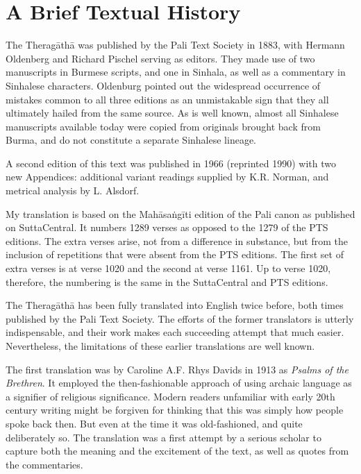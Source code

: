 \documentclass[12pt,openany]{book}%
\begin{document}
\section*{A Brief Textual History}

The \textsanskrit{Theragāthā} was published by the Pali Text Society in 1883, with Hermann Oldenberg and Richard Pischel serving as editors. They made use of two manuscripts in Burmese scripts, and one in Sinhala, as well as a commentary in Sinhalese characters. Oldenburg pointed out the widespread occurrence of mistakes common to all three editions as an unmistakable sign that they all ultimately hailed from the same source. As is well known, almost all Sinhalese manuscripts available today were copied from originals brought back from Burma, and do not constitute a separate Sinhalese lineage.

A second edition of this text was published in 1966 (reprinted 1990) with two new Appendices: additional variant readings supplied by K.R. Norman, and metrical analysis by L. Alsdorf.

My translation is based on the \textsanskrit{Mahāsaṅgīti} edition of the Pali canon as published on SuttaCentral. It numbers 1289 verses as opposed to the 1279 of the PTS editions. The extra verses arise, not from a difference in substance, but from the inclusion of repetitions that were absent from the PTS editions. The first set of extra verses is at verse 1020 and the second at verse 1161. Up to verse 1020, therefore, the numbering is the same in the SuttaCentral and PTS editions.

The \textsanskrit{Theragāthā} has been fully translated into English twice before, both times published by the Pali Text Society. The efforts of the former translators is utterly indispensable, and their work makes each succeeding attempt that much easier. Nevertheless, the limitations of these earlier translations are well known.

The first translation was by Caroline A.F. Rhys Davids in 1913 as \textit{Psalms of the Brethren}. It employed the then-fashionable approach of using archaic language as a signifier of religious significance. Modern readers unfamiliar with early 20th century writing might be forgiven for thinking that this was simply how people spoke back then. But even at the time it was old-fashioned, and quite deliberately so. The translation was a first attempt by a serious scholar to capture both the meaning and the excitement of the text, as well as quotes from the commentaries.
\end{document}
